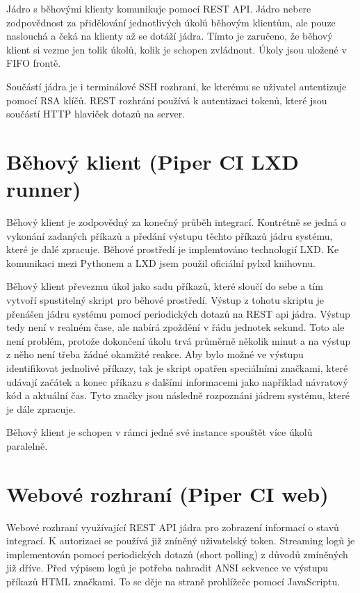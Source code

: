Jádro s běhovými klienty komunikuje pomocí REST API.
Jádro nebere zodpovědnost za přidělování jednotlivých úkolů běhovým klientům, ale pouze naslouchá a čeká na klienty až se dotáží jádra.
Tímto je zaručeno, že běhový klient si vezme jen tolik úkolů, kolik je schopen zvládnout.
Úkoly jsou uložené v FIFO frontě.

Součástí jádra je i terminálové SSH rozhraní, ke kterému se uživatel autentizuje pomocí RSA klíčů.
REST rozhrání používá k autentizaci tokenů, které jsou součástí HTTP hlaviček dotazů na server.

\section{Běhový klient (Piper CI LXD runner)}

Běhový klient je zodpovědný za konečný průběh integrací.
Kontrétně se jedná o vykonání zadaných příkazů a předání výstupu těchto příkazů jádru systému, které je dalé zpracuje.
Běhové prostředí je implemtováno technologií LXD.
Ke komunikaci mezi Pythonem a LXD jsem použil oficiální pylxd knihovnu.

Běhový klient převezmu úkol jako sadu příkazů, které sloučí do sebe a tím vytvoří spustitelný skript pro běhové prostředí.
Výstup z tohotu skriptu je přenášen jádru systému pomocí periodických dotazů na REST api jádra.
Výstup tedy není  v realném čase, ale nabírá zpoždění v řádu jednotek sekund.
Toto ale není problém, protože dokončení úkolu trvá průměrně několik minut a na výstup z něho není třeba žádné okamžité reakce.
Aby bylo možné ve výstupu identifikovat jednolivé příkazy, tak je skript opatřen speciálními značkami, které udávají začátek a konec příkazu s dalšími informacemi jako například návratový kód a aktuální čas.
Tyto značky jsou následně rozpoznáni jádrem systému, které je dále zpracuje.

Běhový klient je schopen v rámci jedné své instance spouštět více úkolů paralelně.

\section{Webové rozhraní (Piper CI web)}

Webové rozhraní využívající REST API jádra pro zobrazení informací o stavů integrací.
K autorizaci se používá již zníněný uživatelský token.
Streaming logů je implementován pomocí periodických dotazů (short polling) z důvodů zmíněných již dříve.
Před výpisem logů je potřeba nahradit ANSI sekvence ve výstupu příkazů HTML značkami.
To se děje na straně prohlížeče pomocí JavaScriptu.

